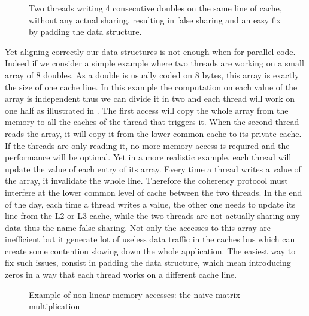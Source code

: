 \begin{figure}[htb]
    \centering
    
    \caption[Example of false sharing.]{Two threads writing 4 consecutive doubles on the same line of cache, without any actual sharing, resulting in false sharing and an easy fix by padding the data structure.}
    \label{fig:false-sharing}
\end{figure}

Yet aligning correctly our data structures is not enough when for parallel code.
Indeed if we  consider a simple example where two threads are working on a small array of $8$ doubles.
As a double is usually coded on $8$ bytes, this array is exactly the size of one cache line.
In this example the computation on each value of the array is independent thus we can divide it in two and each thread will  work on one half as illustrated in .
The first access will copy the whole array from the memory to all the caches of the thread that triggers it.
When the second thread reads the array, it will copy it from the lower common cache to its private cache.
If the threads are only reading it, no more memory access is required and the performance will be optimal.
Yet in a more realistic example, each thread will update the value of each entry of its array.
Every time a thread writes a value of the array, it invalidate the whole line.
Therefore the coherency protocol must interfere at the lower common level of cache between the two threads.
In the end of the day, each time a thread writes a value, the other one needs to update its line from the L2 or L3 cache, while the two threads are not actually sharing any data thus the name false sharing.
Not only the accesses to this array are inefficient but it generate lot of useless data traffic in the caches bus which can create some contention slowing down the whole application.
The easiest way to fix such issues, consist in padding the data structure, which mean introducing zeros in a way that each thread works on a different cache line.

\begin{figure}[htb]
    \centering
    
    \caption{Example of non linear memory accesses: the naive matrix multiplication}
    \label{fig:mat-mult}
\end{figure}


